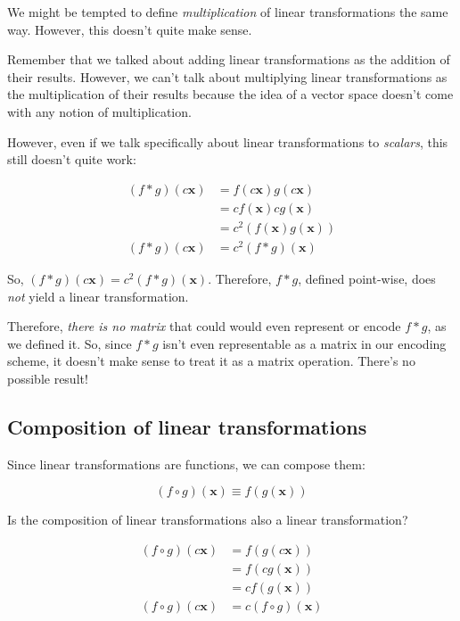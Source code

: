 \documentclass[]{article}
\begin{document}
We might be tempted to define \emph{multiplication} of linear transformations
the same way. However, this doesn't quite make sense.

Remember that we talked about adding linear transformations as the addition of
their results. However, we can't talk about multiplying linear transformations
as the multiplication of their results because the idea of a vector space
doesn't come with any notion of multiplication.

However, even if we talk specifically about linear transformations to
\emph{scalars}, this still doesn't quite work:

\[
\begin{aligned}
(f * g)(c \mathbf{x}) & = f(c \mathbf{x}) g(c \mathbf{x}) \\
                      & = c f(\mathbf{x}) c g(\mathbf{x}) \\
                      & = c^2 ( f(\mathbf{x}) g(\mathbf{x}) ) \\
(f * g)(c \mathbf{x}) & = c^2 (f * g)(\mathbf{x})
\end{aligned}
\]

So, \((f * g)(c \mathbf{x}) = c^2 (f * g)(\mathbf{x})\). Therefore, \(f * g\),
defined point-wise, does \emph{not} yield a linear transformation.

Therefore, \emph{there is no matrix} that could would even represent or encode
\(f *
g\), as we defined it. So, since \(f * g\) isn't even representable as a matrix
in our encoding scheme, it doesn't make sense to treat it as a matrix operation.
There's no possible result!

\subsection{Composition of linear
transformations}\label{composition-of-linear-transformations}

Since linear transformations are functions, we can compose them:

\[
(f \circ g)(\mathbf{x}) \equiv f(g(\mathbf{x}))
\]

Is the composition of linear transformations also a linear transformation?

\[
\begin{aligned}
(f \circ g)(c \mathbf{x}) & = f(g(c \mathbf{x})) \\
                      & = f(c g(\mathbf{x})) \\
                      & = c f(g(\mathbf{x})) \\
(f \circ g)(c \mathbf{x}) & = c (f \circ g)(\mathbf{x})
\end{aligned}
\]
\end{document}
